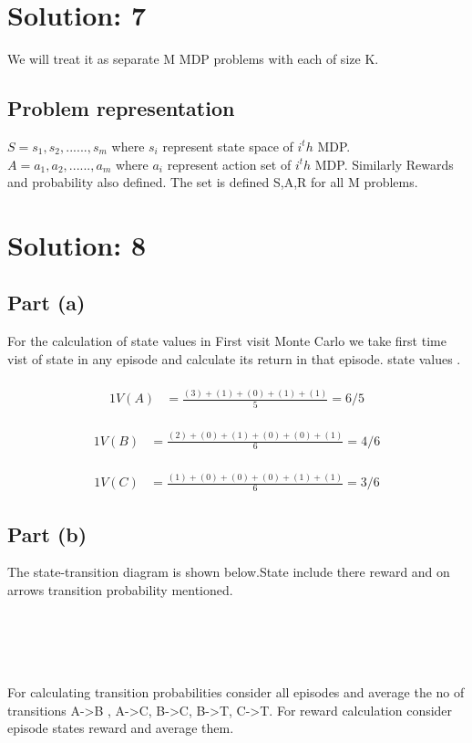\documentclass{article}
\begin{document}
\section{Solution: 7} 
We will treat it as separate M MDP problems with each of size K.
\subsection{Problem representation}
$S={s_1,s_2, . . . . . ., s_m}$
where $s_i$ represent  state space of $i^th$ MDP.
\\$A={a_1,a_2, . . . . . ., a_m}$
where $a_i$ represent  action set of $i^th$ MDP.
Similarly Rewards and probability also defined.
The set is defined {S,A,R} for all M problems.
\section{Solution: 8} 
\subsection{Part (a)}
For the calculation of state values in First visit Monte Carlo we take first time vist of state in any episode and calculate its return in that episode. 
 state values .\\
\\
\begin{alignat*}{1}
V(A) & =\frac{(3)+(1)+(0)+(1)+(1)}{5}=6/5
\end{alignat*}
\\
\begin{alignat*}{1}
V(B) & =\frac{(2)+(0)+(1)+(0)+(0)+(1)}{6}=4/6
\end{alignat*}
\\
\begin{alignat*}{1}
V(C) & =\frac{(1)+(0)+(0)+(0)+(1)+(1)}{6}=3/6
\end{alignat*}


\subsection{Part (b)}
The state-transition diagram is shown below.State include there reward and on arrows transition probability mentioned.\\
\\
\\
\\
\\
For calculating transition probabilities consider all episodes and average the no of transitions A->B , A->C, B->C, B->T, C->T. For reward calculation consider episode states reward and average them.   
\end{document}
